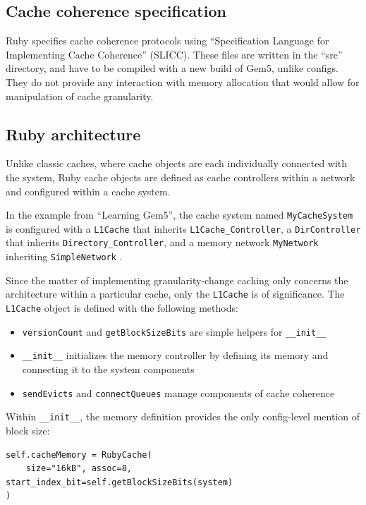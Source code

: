 \documentclass[12pt,twoside]{reedthesis}
\begin{document}
	\subsection*{Cache coherence specification}

	Ruby specifies cache coherence protocols using ``Specification Language for Implementing Cache Coherence'' (SLICC). These files are written in the ``src'' directory, and have to be compiled with a new build of Gem5, unlike configs. They do not provide any interaction with memory allocation that would allow for manipulation of cache granularity.

	\subsection*{Ruby architecture}

	Unlike classic caches, where cache objects are each individually connected with the system, Ruby cache objects are defined as cache controllers within a network and configured within a cache system.
	
	In the example from ``Learning Gem5'', the cache system named \verb`MyCacheSystem` is configured with a \verb`L1Cache` that inherits \verb`L1Cache_Controller`, a \verb`DirController` that inherits \verb`Directory_Controller`, and a memory network \verb`MyNetwork` inheriting \verb`SimpleNetwork` \cite{gem5-tutorial}.

	Since the matter of implementing granularity-change caching only concerns the architecture within a particular cache, only the \verb`L1Cache` is of significance. The \verb`L1Cache` object is defined with the following methods: \begin{itemize}
		\item \verb`versionCount` and \verb`getBlockSizeBits` are simple helpers for \verb`__init__`
		\item \verb`__init__` initializes the memory controller by defining its memory and connecting it to the system components
		\item \verb`sendEvicts` and \verb`connectQueues` manage components of cache coherence
	\end{itemize}

	Within \verb`__init__`, the memory definition provides the only config-level mention of block size: \begin{verbatim}
self.cacheMemory = RubyCache(
    size="16kB", assoc=8, start_index_bit=self.getBlockSizeBits(system)
)\end{verbatim}
\end{document}
